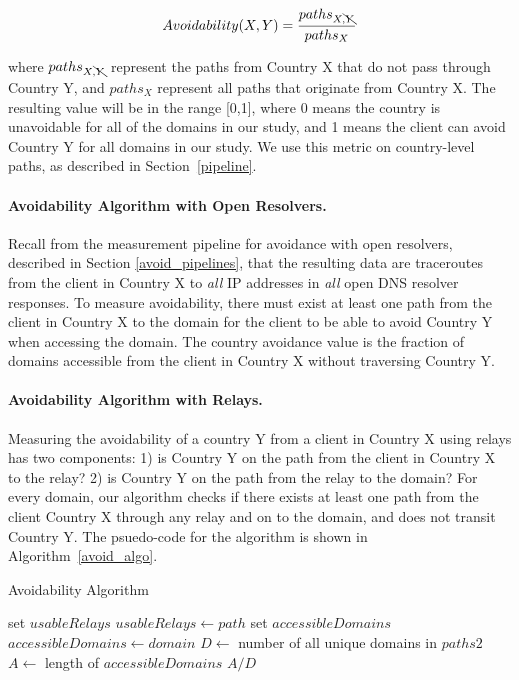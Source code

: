 \[Avoidability(X,Y) = \frac{paths_{X,\bcancel{Y}}}{paths_{X}}\]

\noindent where $paths_{X,\bcancel{Y}}$ represent the paths from Country X that do not pass through Country Y, and $paths_{X}$ represent all paths that originate from Country X. The resulting value will be in the range [0,1], where 0 means the country is unavoidable for all of the domains in our study, and 1 means the client can avoid Country Y for all domains in our study.  We use this metric on country-level paths, as described in Section~\ref{pipeline}.

\paragraph{Avoidability Algorithm with Open Resolvers.} Recall from the measurement pipeline for avoidance with open resolvers, described in Section \ref{avoid_pipelines}, that the resulting data are traceroutes from the client in Country X to \textit{all} IP addresses in \textit{all} open DNS resolver responses.  To measure avoidability, there must exist at least one path from the client in Country X to the domain for the client to be able to avoid Country Y when accessing the domain.  The country avoidance value is the fraction of domains accessible from the client in Country X without traversing Country Y.

\paragraph{Avoidability Algorithm with Relays.}  Measuring the avoidability of a country Y from a client in Country X using relays has two components: 1) is Country Y on the path from the client in Country X to the relay?  2) is Country Y on the path from the relay to the domain?  For every domain, our algorithm checks if there exists at least one path from the client Country X through any relay and on to the domain, and does not transit Country Y.  The psuedo-code for the algorithm is shown in Algorithm~\ref{avoid_algo}.

\begin{algorithm}[t]
\caption{Avoidability Algorithm}
\label{avoid_algo}
\begin{algorithmic}[1]
    \State set $usableRelays$
		\State $usableRelays \gets path$
	\EndIf
    \EndFor
    \State set $accessibleDomains$
        \State $accessibleDomains \gets domain$
        \EndIf
    \EndIf
    \EndFor
    \State $D \gets$ number of all unique domains in $paths2$
    \State $A \gets$ length of $accessibleDomains$
    \State \Return $A / D$
\EndFunction
\end{algorithmic}
\end{algorithm}

